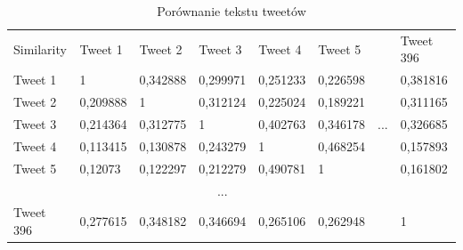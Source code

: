 \documentclass{classrep}
\begin{document}
\begin{table}[H]
    \caption{Porównanie tekstu tweetów}
    \label{similarity}
    \centering
    \begin{tabular}{llllllll}
        \cline{1-6} \cline{8-8}
        \multicolumn{1}{|l|}{Similarity} &
          \multicolumn{1}{l|}{Tweet 1} &
          \multicolumn{1}{l|}{Tweet 2} &
          \multicolumn{1}{l|}{Tweet 3} &
          \multicolumn{1}{l|}{Tweet 4} &
          \multicolumn{1}{l|}{Tweet 5} &
          \multicolumn{1}{c|}{} &
          \multicolumn{1}{l|}{Tweet 396} \\ \cline{1-6} \cline{8-8} 
        \multicolumn{1}{|l|}{Tweet 1} &
          \multicolumn{1}{l|}{1} &
          \multicolumn{1}{l|}{0,342888} &
          \multicolumn{1}{l|}{0,299971} &
          \multicolumn{1}{l|}{0,251233} &
          \multicolumn{1}{l|}{0,226598} &
          \multicolumn{1}{l|}{} &
          \multicolumn{1}{l|}{0,381816} \\ \cline{1-6} \cline{8-8} 
        \multicolumn{1}{|l|}{Tweet 2} &
          \multicolumn{1}{l|}{0,209888} &
          \multicolumn{1}{l|}{1} &
          \multicolumn{1}{l|}{0,312124} &
          \multicolumn{1}{l|}{0,225024} &
          \multicolumn{1}{l|}{0,189221} &
          \multicolumn{1}{l|}{} &
          \multicolumn{1}{l|}{0,311165} \\ \cline{1-6} \cline{8-8} 
        \multicolumn{1}{|l|}{Tweet 3} &
          \multicolumn{1}{l|}{0,214364} &
          \multicolumn{1}{l|}{0,312775} &
          \multicolumn{1}{l|}{1} &
          \multicolumn{1}{l|}{0,402763} &
          \multicolumn{1}{l|}{0,346178} &
          \multicolumn{1}{c|}{...} &
          \multicolumn{1}{l|}{0,326685} \\ \cline{1-6} \cline{8-8} 
        \multicolumn{1}{|l|}{Tweet 4} &
          \multicolumn{1}{l|}{0,113415} &
          \multicolumn{1}{l|}{0,130878} &
          \multicolumn{1}{l|}{0,243279} &
          \multicolumn{1}{l|}{1} &
          \multicolumn{1}{l|}{0,468254} &
          \multicolumn{1}{l|}{} &
          \multicolumn{1}{l|}{0,157893} \\ \cline{1-6} \cline{8-8} 
        \multicolumn{1}{|l|}{Tweet 5} &
          \multicolumn{1}{l|}{0,12073} &
          \multicolumn{1}{l|}{0,122297} &
          \multicolumn{1}{l|}{0,212279} &
          \multicolumn{1}{l|}{0,490781} &
          \multicolumn{1}{l|}{1} &
          \multicolumn{1}{l|}{} &
          \multicolumn{1}{l|}{0,161802} \\ \cline{1-6} \cline{8-8} 
        \multicolumn{1}{c}{} &
           &
           &
          \multicolumn{1}{c}{...} &
           &
           &
           &
          \multicolumn{1}{c}{} \\ \cline{1-6} \cline{8-8} 
        \multicolumn{1}{|l|}{Tweet 396} &
          \multicolumn{1}{l|}{0,277615} &
          \multicolumn{1}{l|}{0,348182} &
          \multicolumn{1}{l|}{0,346694} &
          \multicolumn{1}{l|}{0,265106} &
          \multicolumn{1}{l|}{0,262948} &
          \multicolumn{1}{c|}{} &
          \multicolumn{1}{l|}{1} \\ \cline{1-6} \cline{8-8} 
    \end{tabular}
\end{table}
\end{document}
